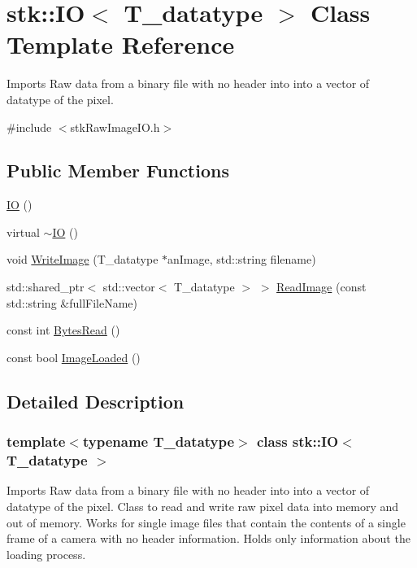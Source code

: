 \hypertarget{classstk_1_1IO}{
\section{stk::IO$<$ T\_\-datatype $>$ Class Template Reference}
\label{classstk_1_1IO}
}


Imports Raw data from a binary file with no header into into a vector of datatype of the pixel.  


{\ttfamily \#include $<$stkRawImageIO.h$>$}\subsection*{Public Member Functions}
\begin{DoxyCompactItemize}
\item 
\hyperlink{classstk_1_1IO_a7bf75895372d604dd9251792cd3dc74f}{IO} ()
\item 
virtual \hyperlink{classstk_1_1IO_a8dad66d04b2367632b64c7f030e5ec2f}{$\sim$IO} ()
\item 
void \hyperlink{classstk_1_1IO_a6318b4ae3772f8c8e38d094eceebe630}{WriteImage} (T\_\-datatype $\ast$anImage, std::string filename)
\item 
std::shared\_\-ptr$<$ std::vector$<$ T\_\-datatype $>$ $>$ \hyperlink{classstk_1_1IO_a5cc5f494be8ac294efb38b96e4fc3742}{ReadImage} (const std::string \&fullFileName)
\item 
const int \hyperlink{classstk_1_1IO_a8bd433a5700222e3e8505984f572d124}{BytesRead} ()
\item 
const bool \hyperlink{classstk_1_1IO_aa99e99b11bfad3119268ea65d593d032}{ImageLoaded} ()
\end{DoxyCompactItemize}


\subsection{Detailed Description}
\subsubsection*{template$<$typename T\_\-datatype$>$ class stk::IO$<$ T\_\-datatype $>$}

Imports Raw data from a binary file with no header into into a vector of datatype of the pixel. Class to read and write raw pixel data into memory and out of memory. Works for single image files that contain the contents of a single frame of a camera with no header information. Holds only information about the loading process. 

